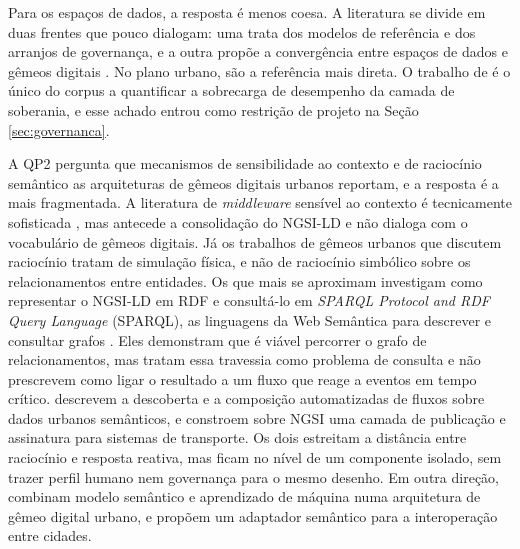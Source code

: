 Para os espaços de dados, a resposta é menos coesa. A literatura se divide em duas frentes que pouco dialogam: uma trata dos modelos de referência e dos arranjos de governança, e a outra propõe a convergência entre espaços de dados e gêmeos digitais \cite{otto2019international,idsa2022ram,tardieu2022role,gaiax2022architecture,somma2023digital,uslander2022symbiotic,coppolino2025simulation,vogt2024towards}. No plano urbano,  são a referência mais direta. O trabalho de  é o único do corpus a quantificar a sobrecarga de desempenho da camada de soberania, e esse achado entrou como restrição de projeto na Seção \ref{sec:governanca}.

A QP2 pergunta que mecanismos de sensibilidade ao contexto e de raciocínio semântico as arquiteturas de gêmeos digitais urbanos reportam, e a resposta é a mais fragmentada. A literatura de \textit{middleware} sensível ao contexto é tecnicamente sofisticada \cite{lopes2009context,lopes2013middleware,liang2015social,sezer2018context}, mas antecede a consolidação do NGSI-LD e não dialoga com o vocabulário de gêmeos digitais. Já os trabalhos de gêmeos urbanos que discutem raciocínio tratam de simulação física, e não de raciocínio simbólico sobre os relacionamentos entre entidades. Os que mais se aproximam investigam como representar o NGSI-LD em RDF e consultá-lo em \textit{SPARQL Protocol and RDF Query Language} (SPARQL), as linguagens da Web Semântica para descrever e consultar grafos \cite{abid2022toward,viola2019mapping,drobnic2026automatic,gonzalez2024reshaping}. Eles demonstram que é viável percorrer o grafo de relacionamentos, mas tratam essa travessia como problema de consulta e não prescrevem como ligar o resultado a um fluxo que reage a eventos em tempo crítico.  descrevem a descoberta e a composição automatizadas de fluxos sobre dados urbanos semânticos, e  constroem sobre NGSI uma camada de publicação e assinatura para sistemas de transporte. Os dois estreitam a distância entre raciocínio e resposta reativa, mas ficam no nível de um componente isolado, sem trazer perfil humano nem governança para o mesmo desenho. Em outra direção,  combinam modelo semântico e aprendizado de máquina numa arquitetura de gêmeo digital urbano, e  propõem um adaptador semântico para a interoperação entre cidades.

